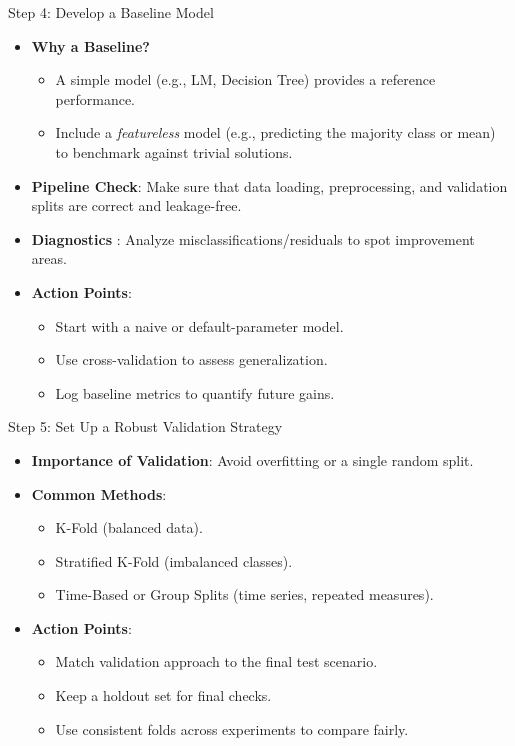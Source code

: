 \documentclass[10pt,compress,t,notes=noshow, xcolor=table]{beamer}
\begin{document}
\begin{frame}{Step 4: Develop a Baseline Model}
\begin{itemize}
  \item \textbf{Why a Baseline?} 
  \begin{itemize}
      \item A simple model (e.g., LM, Decision Tree) provides a reference performance.
      \item Include a \emph{featureless} model (e.g., predicting the majority class or mean) to benchmark against trivial solutions.
  \end{itemize}
  \item \textbf{Pipeline Check}: Make sure that data loading, preprocessing, and validation splits are correct and leakage-free.
  \item \textbf{Diagnostics} : Analyze misclassifications/residuals to spot improvement areas.
  \item \textbf{Action Points}:
    \begin{itemize}
      \item Start with a naive or default-parameter model.
      \item Use cross-validation to assess generalization.
      \item Log baseline metrics to quantify future gains.
    \end{itemize}
\end{itemize}
\end{frame}

\begin{frame}{Step 5: Set Up a Robust Validation Strategy}
\begin{itemize}
  \item \textbf{Importance of Validation}: Avoid overfitting or a single random split.
  \item \textbf{Common Methods}:
    \begin{itemize}
      \item K-Fold (balanced data).
      \item Stratified K-Fold (imbalanced classes).
      \item Time-Based or Group Splits (time series, repeated measures).
    \end{itemize}
  \item \textbf{Action Points}:
    \begin{itemize}
      \item Match validation approach to the final test scenario.
      \item Keep a holdout set for final checks.
      \item Use consistent folds across experiments to compare fairly.
    \end{itemize}
\end{itemize}
\end{frame}
\end{document}
